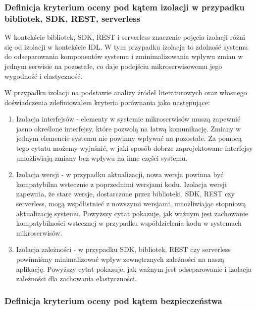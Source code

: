 \documentclass[runningheads,12pt]{llncs}
\begin{document}
\subsubsection{Definicja kryterium oceny pod kątem izolacji w przypadku bibliotek, SDK, REST, serverless}

W kontekście bibliotek, SDK, REST i serverless znaczenie pojęcia izolacji różni się od izolacji w kontekście IDL. W tym przypadku izolacja to zdolność systemu do odseparowania komponentów systemu i zminimalizowania wpływu zmian w jednym serwisie na pozostałe, co daje podejściu mikroserwisowemu jego wygodność i elastyczność.

W przypadku izolacji na podstawie analizy źródeł literaturowych oraz własnego doświadczenia zdefiniowałem kryteria porównania jako następujące:

\begin{enumerate}
    \item Izolacja interfejsów - elementy w systemie mikroserwisów muszą zapewnić jasno określone interfejsy, które pozwolą na łatwą komunikację. Zmiany w jednym elemencie systemu nie powinny wpływać na pozostałe.
    Za pomocą tego cytatu możemy wyjaśnić, w jaki sposób dobrze zaprojektowane interfejsy umożliwiają zmiany bez wpływu na inne części systemu. ~\cite[p. 75]{bloch2018effective}
    \item Izolacja wersji - w przypadku aktualizacji, nowa wersja powinna być kompatybilna wstecznie z poprzednimi wersjami kodu. Izolacja wersji zapewnia, że stare wersje, dostarczone przez biblioteki, SDK, REST czy serverless, mogą współistnieć z nowszymi wersjami, umożliwiając stopniową aktualizację systemu.
    Powyższy cytat pokazuje, jak ważnym jest zachowanie kompatybilności wstecznej w przypadku współdzielenia kodu w systemach mikroserwisów. ~\cite[p. 172]{fowler2012patterns}
    \item Izolacja zależności - w przypadku SDK, bibliotek, REST czy serverless powinniśmy minimalizować wpływ zewnętrznych zależności na naszą aplikację.
    Powyższy cytat pokazuje, jak ważnym jest odseparowanie i izolacja zależności dla zachowania elastyczności. ~\cite[p. 218]{martin2008clean}
\end{enumerate}

\subsubsection{Definicja kryterium oceny pod kątem bezpieczeństwa}
\end{document}
